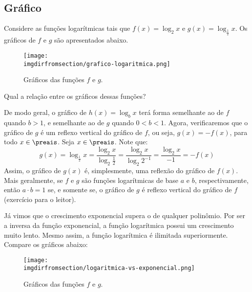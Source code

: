 \subsection{Gráfico}

\begin{example}
    Considere as funções logarítmicas tais que $f(x) = \log_2 x$ e $g(x) = \log_{\frac 1 2} x$. Os gráficos de $f$ e $g$ são apresentados abaixo.
    \begin{figure}[H]
        \centering
        \texttt{[image: \\imgdirfromsection/grafico-logaritmica.png]}
        \caption{Gráficos das funções $f$ e $g$.}
        \label{img:grafico-logaritmica}
    \end{figure}
\end{example}

Qual a relação entre os gráficos dessas funções?

\begin{solution}
    De modo geral, o gráfico de $h(x) = \log_b x$ terá forma semelhante ao de $f$ quando $b>1$, e semelhante
    ao de  $g$ quando $0<b<1$. Agora, verificaremos que o gráfico de $g$ é um reflexo vertical do gráfico de $f$,
    ou seja, $g(x) =  -f(x)$, para todo $x \in \preais$. Seja $x \in \preais$.
    Note que:
    $$g(x) = \log_{\frac 1 2} x = \frac{\log_2 x}{\log_2 \frac 1 2}= \frac{\log_2 x}{\log_2 2^{-1}}=\frac{\log_2 x}{-1}=-f(x) $$
    Assim, o gráfico de $g(x)$ é, simplesmente, uma reflexão do gráfico de $f(x)$. Mais geralmente,
    se $f$ e $g$ são funções logarítmicas de base $a$ e $b$, respectivamente, então $a\cdot b = 1$ se,
    e somente se, o gráfico de $g$ é reflexo vertical do gráfico de $f$ (exercício para o leitor).
\end{solution}

\begin{remark}
    Já vimos que o crescimento exponencial supera o de qualquer polinômio. Por ser a inversa da função exponencial, a função logarítmica possui um crescimento muito lento. Mesmo assim, a função logarítmica é ilimitada superiormente. Compare os gráficos abaixo:
\end{remark}

\begin{figure}[H]
    \centering
    \texttt{[image: \\imgdirfromsection/logaritmica-vs-exponencial.png]}
    \caption{Gráficos das funções $f$ e $g$.}
    \label{img:logaritmica-vs-exponencial}
\end{figure}

\begin{onlineact}
\end{onlineact}